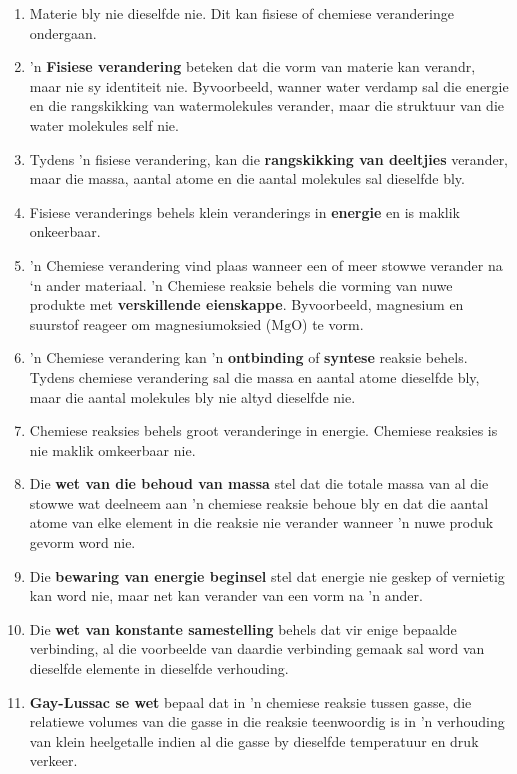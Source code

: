       \label{m38711*id65342}\begin{enumerate}[noitemsep, label=\textbf{\arabic*}. ] 
            \label{m38711*uid40}\item Materie bly nie dieselfde nie. Dit kan fisiese of chemiese veranderinge ondergaan.
\label{m38711*uid41}\item 'n \textbf{Fisiese verandering} beteken dat die vorm van materie kan verandr, maar nie sy identiteit nie. Byvoorbeeld, wanner water verdamp sal die energie en die rangskikking van watermolekules verander, maar die struktuur van die water molekules self nie.
\label{m38711*uid42}\item Tydens 'n fisiese verandering, kan die \textbf{rangskikking van deeltjies} verander, maar die massa, aantal atome en die aantal molekules sal dieselfde bly.
\label{m38711*uid43}\item Fisiese veranderings behels klein veranderings in \textbf{energie} en is maklik onkeerbaar.
\label{m38711*uid44}\item 'n Chemiese verandering vind plaas wanneer een of meer stowwe verander na ‘n ander materiaal. 'n
Chemiese reaksie behels die vorming van nuwe produkte met \textbf{verskillende eienskappe}. Byvoorbeeld, magnesium en suurstof reageer om magnesiumoksied ($\text{MgO}$) te vorm.
\label{m38711*uid45}\item 'n Chemiese verandering kan 'n \textbf{ontbinding} of \textbf{syntese} reaksie behels. Tydens chemiese
verandering sal die massa en aantal atome dieselfde bly, maar die aantal molekules bly nie altyd dieselfde nie.
\label{m38711*uid46}\item Chemiese reaksies behels groot veranderinge in energie. Chemiese reaksies is nie maklik omkeerbaar nie.
\label{m38711*uid48}\item Die \textbf{wet van die behoud van massa} stel dat die totale massa van al die stowwe wat deelneem aan 'n chemiese reaksie behoue bly en dat die aantal atome van elke element in die reaksie nie verander wanneer 'n nuwe produk gevorm word nie.
\label{m38711*uid49}\item Die \textbf{bewaring van energie beginsel} stel dat energie nie geskep of vernietig kan word nie, maar net kan verander van een vorm na 'n ander.
\label{m38711*uid50}\item Die \textbf{wet van konstante samestelling} behels dat vir enige bepaalde verbinding, al die voorbeelde van daardie verbinding gemaak sal word van dieselfde elemente in dieselfde verhouding.
\label{m38711*uid51}\item \textbf{Gay-Lussac se wet} bepaal dat in 'n chemiese reaksie tussen gasse, die relatiewe volumes van die gasse in die reaksie teenwoordig is in 'n verhouding van klein heelgetalle indien al die gasse by dieselfde temperatuur en druk verkeer.
\end{enumerate}
